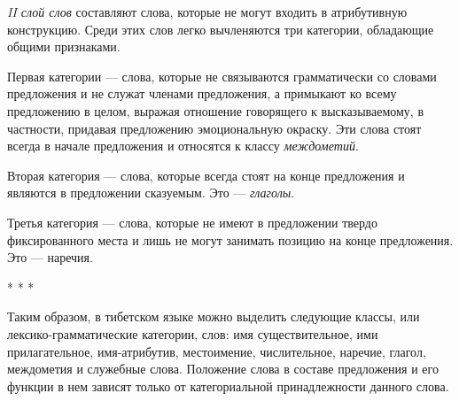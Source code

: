 \emph{II слой слов} составляют слова, которые не могут входить в атрибутивную конструкцию. Среди этих слов легко вычленяются три категории, обладающие общими признаками.

Первая категории --- слова, которые не связываются грамматически со словами предложения и не служат членами предложения, а примыкают ко всему предложению в целом, выражая отношение говорящего к высказываемому, в частности, придавая предложению эмоциональную окраску. Эти слова стоят всегда в начале предложения и относятся к классу \emph{междометий}.

Вторая категория --- слова, которые всегда стоят на конце предложения и являются в предложении сказуемым. Это --- \emph{глаголы}.

Третья категория --- слова, которые не имеют в предложении твердо фиксированного места и лишь не могут занимать позицию на конце предложения. Это --- наречия.

\begin{center}
* * *
\end{center}

Таким образом, в тибетском языке можно выделить следующие классы, или лексико-грамматические категории, слов: имя существительное, ими прилагательное, имя-атрибутив, местоимение, числительное, наречие, глагол, междометия и служебные слова. Положение слова в составе предложения и его функции в нем зависят только от категориальной принадлежности данного слова.